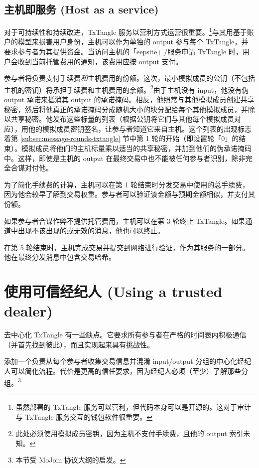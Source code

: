 \subsection{主机即服务 (Host as a service)}
\label{subsec:txtangle-host-service}

对于可持续性和持续改进，TxTangle 服务以营利方式运营很重要。\footnote{虽然部署的 TxTangle 服务可以营利，但代码本身可以是开源的。这对于审计与 TxTangle 服务交互的钱包软件很重要。}与其用基于账户的模型来损害用户身份，主机可以作为单独的 output 参与每个 TxTangle，并要求参与者为其提供资金。当访问主机的「eepsite」/服务申请 TxTangle 时，用户会收到当前托管费用的通知，该费用应按 output 支付。

参与者将负责支付手续费{\em 和}主机费用的份额。这次，最小模拟成员的公钥（不包括主机的密钥）将承担手续费和主机费用的余额。\footnote{此处必须使用模拟成员密钥，因为主机不支付手续费，且他的 output 索引未知。}由于主机没有 input，他没有伪 output 承诺来抵消其 output 的承诺掩码。相反，他照常与其他模拟成员创建共享秘密，然后将他真正的承诺掩码分成随机大小的块分配给每个其他模拟成员，并除以共享秘密。他发布这些标量的列表（根据公钥将它们与其他每个模拟成员对应），用他的模拟成员密钥签名，让参与者知道它来自主机。这个列表的出现标志着第 \ref{subsec:message-rounds-txtangle} 节中第 1 轮的开始（即设置轮「0」的结束）。模拟成员将他们的主机标量乘以适当的共享秘密，并加到他们的伪承诺掩码中。这样，即使是主机的 output 在最终交易中也不能被任何参与者识别，除非完全合谋对付他。

为了简化手续费的计算，主机可以在第 1 轮结束时分发交易中使用的总手续费，因为他会较早了解到交易权重。参与者可以验证该金额与预期金额相似，并支付其份额。

如果参与者合谋作弊不提供托管费用，主机可以在第 3 轮终止 TxTangle。如果通道中出现不该出现的或无效的消息，他也可以终止。

在第 5 轮结束时，主机完成交易并提交到网络进行验证，作为其服务的一部分。他在最终分发消息中包含交易哈希。



\section{使用可信经纪人 (Using a trusted dealer)}
\label{sec:dealer-txtangle}

去中心化 TxTangle 有一些缺点。它要求所有参与者在严格的时间表内积极通信（并首先找到彼此），而且实现起来具有挑战性。

添加一个负责从每个参与者收集交易信息并混淆 input/output 分组的中心化经纪人可以简化流程。代价是更高的信任要求，因为经纪人必须（至少）了解那些分组。\footnote{本节受 MoJoin 协议大纲的启发。}


